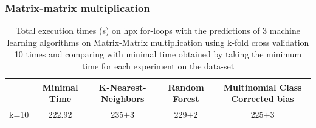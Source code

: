 \newpage
\subsubsection{Matrix-matrix multiplication}
\begin{table}[h]
	\centering
	\caption{Total execution times (s) on hpx for-loops with the predictions of 3 machine learning algorithms on Matrix-Matrix multiplication using k-fold cross validation 10 times and comparing with minimal time obtained by taking the minimum time for each experiment on the data-set}
	\label{my-label}
	\begin{tabular}{|c|c|c|c|c|}
		\hline
		& Minimal Time&K-Nearest-Neighbors & Random Forest &Multinomial Class Corrected bias\\ \hline
		k=10  &222.92&
		235$\pm$3       & 229$\pm$2&225$\pm$3 \\ \hline
	\end{tabular}
\end{table}

